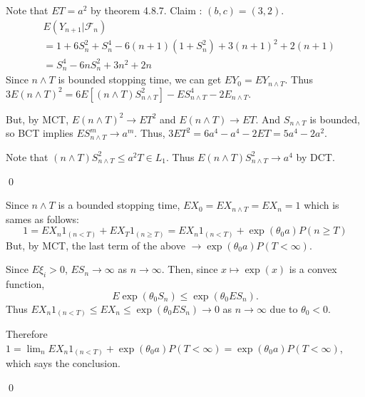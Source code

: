 \begin{problem}[4.8.7] \hfill

	Note that $ET = a^2$ by theorem 4.8.7.
	Claim : $(b, c) = (3, 2)$.
	\[
		\begin{split}
			& E(Y_{n+1}|\mathcal{F}_n) \\
			& = 1+6S_n^2 +S_n^4 -6(n+1)(1+S_n^2) + 3(n+1)^2 +2(n+1) \\
			& = S_n^4 -6n S_n^2 + 3n^2 +2n
		\end{split}
	\]
	Since $n\wedge T$ is bounded stopping time, we can get $EY_0 = EY_{n\wedge T}$.
	Thus $3E(n\wedge T)^2 = 6E\left[ (n\wedge T)S_{n\wedge T}^2 \right] - ES_{n\wedge T}^4 - 2E_{n\wedge T}$.
	
	But, by MCT, $E(n\wedge T)^2 \rightarrow ET^2$ and $E(n\wedge T) \rightarrow ET$.
	And $S_{n\wedge T}$ is bounded, so BCT implies $ES_{n\wedge T}^m \rightarrow a^m$.
	Thus, $3ET^2 = 6a^4 - a^4 - 2ET = 5a^4 -2a^2$.

	Note that $(n\wedge T)S_{n\wedge T}^2 \leq a^2T \in L_1$. Thus $E(n\wedge T)S_{n\wedge T}^2 \rightarrow a^4$ by DCT.

	\qed	
\end{problem}

\begin{problem}[4.8.9] \hfill
	
	Since $n \wedge T$ is a bounded stopping time, $EX_0 = EX_{n \wedge T} = EX_n = 1$ which is sames as follows:
	\[
		1 = EX_n 1_{(n < T)} + EX_T 1_{(n \geq T)} = EX_{n} 1_{(n < T)} + \exp(\theta_0 a)P(n \geq T)
	\]
	But, by MCT, the last term of the above $\rightarrow \exp(\theta_0 a) P(T < \infty)$.

	Since $E\xi_i > 0$, $ES_n \rightarrow \infty$ as $n\rightarrow \infty$.
	Then, since $x \mapsto \exp(x)$ is a convex function,
	\[
		E \exp(\theta_0 S_n) \leq \exp(\theta_0 ES_n).
	\]
	Thus $EX_n 1_{(n< T)} \leq EX_n \leq \exp(\theta_0 ES_n) \rightarrow 0$ as $n\rightarrow \infty$ due to $\theta_0 <0$.

	Therefore $1 = \lim_n EX_n 1_{(n < T)} +\exp(\theta_0 a)P(T<\infty) = \exp(\theta_0 a) P(T < \infty)$, which says the conclusion.

	\qed

\end{problem}

